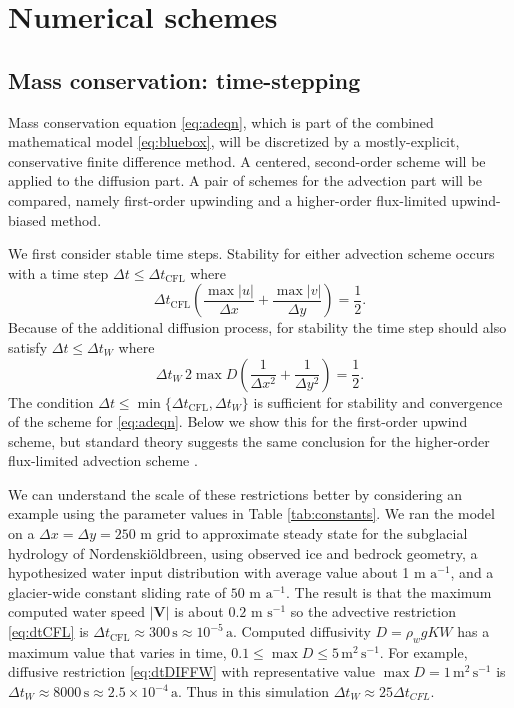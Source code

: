 \documentclass[gmd]{copernicus}   %
\newcommand{\text}{\textrm}
\newcommand\bV{\mathbf{V}}
\newcommand{\Nbreen}{Nordenski\"oldbreen\xspace}
\begin{document}
\section{Numerical schemes}  \label{sec:num}

\subsection{Mass conservation: time-stepping}  Mass conservation equation \eqref{eq:adeqn}, which is part of the combined mathematical model \eqref{eq:bluebox}, will be discretized by a mostly-explicit, conservative finite difference method.   A centered, second-order scheme will be applied to the diffusion part.  A pair of schemes for the advection part will be compared, namely first-order upwinding and a higher-order flux-limited upwind-biased method.

We first consider stable time steps.  Stability for either advection scheme occurs with a time step $\Delta t \le \Delta t_{\text{CFL}}$ where
\begin{equation}
\Delta t_{\text{CFL}} \left(\frac{\max |u|}{\Delta x} + \frac{\max |v|}{\Delta y}\right) = \frac{1}{2}. \label{eq:dtCFL}
\end{equation}
Because of the additional diffusion process, for stability the time step should also satisfy $\Delta t \le \Delta t_{W}$  where \citep{MortonMayers}
\begin{equation}
\Delta t_W\, 2 \max D \left(\frac{1}{\Delta x^2} + \frac{1}{\Delta y^2}\right) = \frac{1}{2}. \label{eq:dtDIFFW}
\end{equation}
The condition $\Delta t \le \min\{\Delta t_{\text{CFL}}, \Delta t_W\}$ is sufficient for stability and convergence of the scheme for \eqref{eq:adeqn}.  Below we show this for the first-order upwind scheme, but standard theory suggests the same conclusion for the higher-order flux-limited advection scheme \citep{HundsdorferVerwer2010}.

We can understand the scale of these restrictions better by considering an example using the parameter values in Table \ref{tab:constants}.  We ran the model on a $\Delta x = \Delta y = 250$ m grid to approximate steady state for the subglacial hydrology of \Nbreen \citep{vanPeltthesis,vanPeltetal}, using observed ice and bedrock geometry, a hypothesized water input distribution with average value about 1 m $\text{a}^{-1}$, and a glacier-wide constant sliding rate of $50$ m $\text{a}^{-1}$.  The result is that the maximum computed water speed $|\bV|$ is about $0.2$ m $\text{s}^{-1}$ so the advective restriction \eqref{eq:dtCFL} is $\Delta t_{\text{CFL}} \approx 300\,\text{s} \approx 10^{-5}\,\text{a}$.  Computed diffusivity $D = \rho_w g K W$ has a maximum value that varies in time, $0.1 \le \max D \le 5 \,\text{m}^2\,\text{s}^{-1}$.  For example, diffusive restriction \eqref{eq:dtDIFFW} with representative value $\max D=1\,\text{m}^2\,\text{s}^{-1}$ is $\Delta t_W \approx 8000\,\text{s} \approx 2.5 \times 10^{-4}\,\text{a}$.  Thus in this simulation $\Delta t_W \approx 25 \Delta t_{CFL}$.
\end{document}
